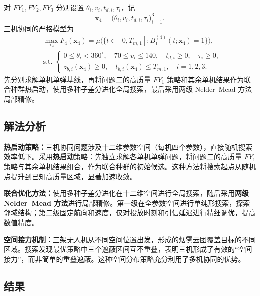 \documentclass[12pt,a4paper]{article}
\begin{document}
对 $FY_1,FY_2,FY_3$ 分别设置 $\theta_i,v_i,t_{d,i},\tau_i$，记
\begin{equation}
\boldsymbol x_4=\bigl(\theta_i,v_i,t_{d,i},\tau_i\bigr)_{i=1}^{3}.
\end{equation}
三机协同的严格模型为
\begin{equation}
\begin{aligned}
&\max_{\boldsymbol x_4} F_4(\boldsymbol x_4)
=\mu\bigl(\{t\in[0,T_{m,1}]:B_1^{(4)}(t;\boldsymbol x_4)=1\}\bigr), \\[6pt]
&\mathrm{s.t.}\; \left\{\begin{array}{l}
0\le\theta_i<360^\circ,\quad 70\le v_i\le140,\quad t_{d,i}\ge0,\quad \tau_i\ge0, \\
z_{b,i}(\boldsymbol x_4)\ge0,\quad t_{b,i}(\boldsymbol x_4)\le T_{m,1},\quad i=1,2,3.
\end{array}\right.
\end{aligned}
\label{eq:q4-model}
\end{equation}
先分别求解单机单弹基线，再将问题二的高质量 $FY_1$ 策略和其余单机结果作为联合种群热启动，使用多种子差分进化全局搜索，最后采用两级 Nelder--Mead 方法局部精修\cite{nelder1965}。

\subsection{解法分析}

\textbf{热启动策略：}三机协同问题涉及十二维参数空间（每机四个参数），直接随机搜索效率低下。采用\textbf{热启动}策略：先独立求解各单机单弹问题，将问题二的高质量 $FY_1$ 策略与其余单机结果组合，作为联合种群的初始候选。这种方法将搜索起点从随机点提升到已知高质量区域，显著加速收敛。

\textbf{联合优化方法：}使用多种子差分进化在十二维空间进行全局搜索，随后采用\textbf{两级 Nelder--Mead 方法}\cite{nelder1965}进行局部精修。第一级在全参数空间进行单纯形搜索，探索邻域结构；第二级固定航向和速度，仅对投放时刻和引信延迟进行精细调优，提高数值精度。

\textbf{空间接力机制：}三架无人机从不同空间位置出发，形成的烟雾云团覆盖目标的不同区域。搜索发现最优策略中三个遮蔽区间互不重叠，表明三机形成了有效的“空间接力”，而非简单的重叠遮蔽。这种空间分布策略充分利用了多机协同的优势。

\subsection{结果}
\end{document}
